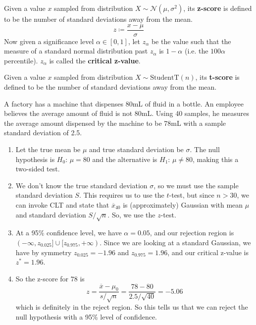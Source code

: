 \documentclass{article}
\begin{document}
    \begin{definition}[Z-score]
      Given a value $x$ sampled from distribution $X \sim \mathcal{N}(\mu, \sigma^2)$, its \textbf{z-score} is defined to be the number of standard deviations away from the mean. 
      \begin{equation}
        z \coloneqq \frac{x - \mu}{\sigma}
      \end{equation}
      Now given a significance level $\alpha \in [0, 1]$, let $z_\alpha$ be the value such that the measure of a standard normal distribution past $z_\alpha$ is $1 - \alpha$ (i.e. the $100\alpha$ percentile). $z_\alpha$ is called the \textbf{critical z-value}.
    \end{definition}

    \begin{definition}[T-score]
      Given a value $x$ sampled from distribution $X \sim \mathrm{StudentT}(n)$, its \textbf{t-score} is defined to be the number of standard deviations away from the mean. 
    \end{definition}

    \begin{example}
      A factory has a machine that dispenses 80mL of fluid in a bottle. An employee believes the average amount of fluid is not 80mL. Using 40 samples, he measures the average amount dispensed by the machine to be 78mL with a sample standard deviation of 2.5. 
      \begin{enumerate}
        \item Let the true mean be $\mu$ and true standard deviation be $\sigma$. The null hypothesis is $H_0 : \, \mu = 80$ and the alternative is $H_1 : \, \mu \neq 80$, making this a two-sided test. 
        
        \item We don't know the true standard deviation $\sigma$, so we must use the sample standard deviation $S$. This requires us to use the $t$-test, but since $n > 30$, we can invoke CLT and state that $\overline{x}_{40}$ is (approximately) Gaussian with mean $\mu$ and standard deviation $S / \sqrt{n}$. So, we use the $z$-test. 
        
        \item At a 95\% confidence level, we have $\alpha = 0.05$, and our rejection region is $(-\infty, z_{0.025}] \cup [z_{0.975}, +\infty)$. Since we are looking at a standard Gaussian, we have by symmetry $z_{0.025} = -1.96$ and $z_{0.975} = 1.96$, and our critical z-value is $z^\ast = 1.96$. 
        
        \item So the z-score for $78$ is 
        \begin{equation}
          z = \frac{\overline{x} - \mu_0}{s / \sqrt{n}} = \frac{78 - 80}{2.5 / \sqrt{40}} = -5.06
        \end{equation}
        which is definitely in the reject region. So this tells us that we can reject the null hypothesis with a 95\% level of confidence. 
      \end{enumerate}
    \end{example}
\end{document}
